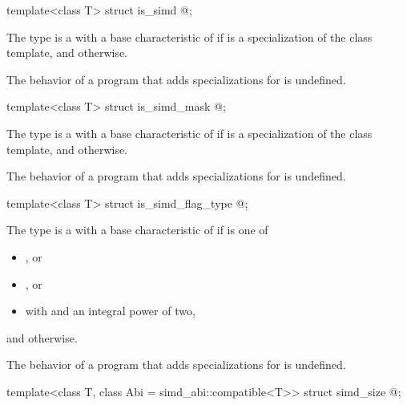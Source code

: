 \begin{wgText}
\begin{itemdecl}
template<class T> struct is_simd { @\seebelow@ };
\end{itemdecl}

\begin{itemdescr}
\pnum
The type  is a  with a base characteristic of  if  is a specialization of the  class template, and  otherwise.

\pnum
The behavior of a program that adds specializations for  is undefined.
\end{itemdescr}

\begin{itemdecl}
template<class T> struct is_simd_mask { @\seebelow@ };
\end{itemdecl}

\begin{itemdescr}
\pnum
The type  is a  with a base characteristic of  if  is a specialization of the  class template, and  otherwise.

\pnum
The behavior of a program that adds specializations for  is undefined.
\end{itemdescr}

\begin{itemdecl}
template<class T> struct is_simd_flag_type { @\seebelow@ };
\end{itemdecl}

\begin{itemdescr}
\pnum
The type  is a  with a base characteristic of  if  is one of
\begin{itemize}
  \item {}, or
  \item {}, or
  \item {} with  and  an integral power of two,
\end{itemize}
and  otherwise.

\pnum
The behavior of a program that adds specializations for  is undefined.
\end{itemdescr}

\begin{itemdecl}
template<class T, class Abi = simd_abi::compatible<T>> struct simd_size { @\seebelow@ };
\end{itemdecl}


\end{wgText}
